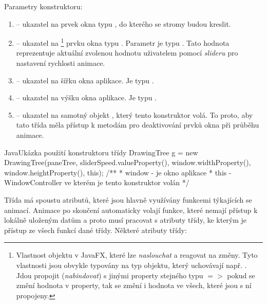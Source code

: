 \documentclass[
  biblatex=false,
  font=serif,
  glossaries=false,
  tables=false,
  theorems=false,
  index
]{kidiplom}
\begin{document}
\noindent Parametry konstruktoru:
\begin{enumerate}
\item {} -- ukazatel na prvek okna typu , do kterého se stromy budou kreslit.
\item {} -- ukazatel na \footnote{Vlastnost objektu v JavaFX, které lze \textit{naslouchat} a reagovat na změny. Tyto vlastnosti jsou obvykle typovány na typ objektu, který uchovávají např. . Jdou propojit (\textit{nabindovat}) s jinými property stejného typu $=>$ pokud se změní hodnota v property, tak se změní i hodnota ve všech, které jsou s ní propojeny.} prvku okna typu . Parametr je typu . Tato hodnota reprezentuje aktuální zvolenou hodnotu uživatelem pomocí \textit{slideru} pro nastavení rychlosti animace.
\item {} -- ukazatel na  šířku okna aplikace. Je typu .
\item {} -- ukazatel na  výšku okna aplikace. Je typu .
\item {} -- ukazatel na samotný objekt , který tento konstruktor volá. To proto, aby tato třída měla přístup k metodám pro deaktivování prvků okna při průběhu animace. 
\end{enumerate}
\begin{kicode}{Java}{}{Ukázka použití konstruktoru třídy DrawingTree}
g = new DrawingTree(paneTree, sliderSpeed.valueProperty(), window.widthProperty(), window.heightProperty(), this); 
/**
* window - je okno aplikace
* this -  WindowController ve kterém je tento konstruktor volán
*/
\end{kicode}
Třída má spoustu atributů, které jsou hlavně využívány funkcemi týkajících se animací. Animace po skončení automaticky volají funkce, které nemají přístup k lokálně uloženým datům a proto musí pracovat s atributy třídy, ke kterým je přístup ze všech funkcí dané třídy.
\noindent Některé atributy třídy:
\end{document}

